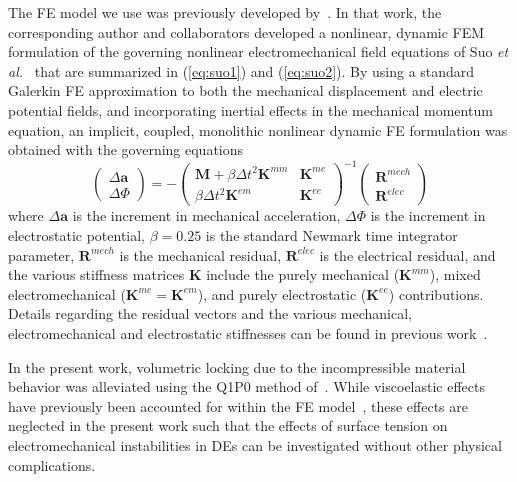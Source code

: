 \documentclass[final,authoryear,3p,times]{elsarticle}
\newcommand{\mbf}{\mathbf}
\begin{document}
The FE model we use was previously developed by~\citet{parkIJSS2012}.  In that work, the corresponding author and collaborators developed a nonlinear, dynamic FEM formulation of the governing nonlinear electromechanical field equations of Suo \emph{et al.}~\cite{suoJMPS2008} that are summarized in (\ref{eq:suo1}) and (\ref{eq:suo2}).  By using a standard Galerkin FE approximation to both the mechanical displacement and electric potential fields, and incorporating inertial effects in the mechanical momentum equation, an implicit, coupled, monolithic nonlinear dynamic FE formulation was obtained with the governing equations~\citep{parkIJSS2012}
\begin{equation}\label{eq:fe1} \left(\begin{array}{cc}{\Delta\mbf{a}} \\ {\Delta\Phi}\end{array}\right)=-\left(\begin{array}{cc} {\mbf{M}+\beta\Delta t^{2}\mbf{K}^{mm}} & {\mbf{K}^{me}} \\ {\beta\Delta t^{2}\mbf{K}^{em}} & {\mbf{K}^{ee}} \end{array}\right)^{-1}\left(\begin{array}{cc}{\mbf{R}^{mech}} \\ {\mbf{R}^{elec}}\end{array}\right)
\end{equation}
where $\Delta\mbf{a}$ is the increment in mechanical acceleration, $\Delta\Phi$ is the increment in electrostatic potential, $\beta=0.25$ is the standard Newmark time integrator parameter, $\mbf{R}^{mech}$ is the mechanical residual, $\mbf{R}^{elec}$ is the electrical residual, and the various stiffness matrices $\mbf{K}$ include the purely mechanical ($\mbf{K}^{mm}$), mixed electromechanical ($\mbf{K}^{me}=\mbf{K}^{em}$), and purely electrostatic ($\mbf{K}^{ee}$) contributions.  Details regarding the residual vectors and the various mechanical, electromechanical and electrostatic stiffnesses can be found in previous work~\citep{parkIJSS2012}.  

In the present work, volumetric locking due to the incompressible material behavior was alleviated using the Q1P0 method of~\citet{simoCMAME1985}.  While viscoelastic effects have previously been accounted for within the FE model~\citep{parkSM2013}, these effects are neglected in the present work such that the effects of surface tension on electromechanical instabilities in DEs can be investigated without other physical complications.
\end{document}
